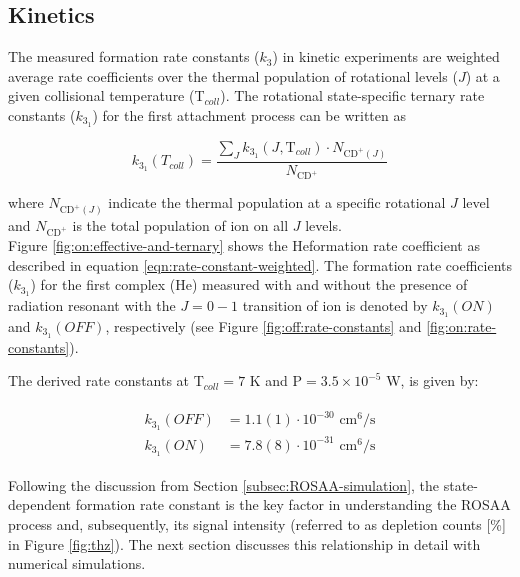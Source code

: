 \subsection{Kinetics}
\label{subsec:CD+-kinetics}

The measured formation rate constants ($k_3$) in kinetic experiments are 
weighted average rate coefficients over the thermal population of rotational
levels ($J$) at a given collisional temperature (T$_{coll}$). The rotational
state-specific ternary rate constants ($k_{3_1}$) for the first attachment
process can be written as

\begin{equation}
    k_{3_1} (T_{coll}) = \frac{\sum_{J} k_{3_1} (J, \text{T}_{coll}) \cdot N_{\text{CD}^+ (J)} }{N_{\text{CD}^+}}
    \label{eqn:rate-constant-weighted}
\end{equation}

where $N_{\text{CD}^+ (J)}$ indicate the thermal population 
at a specific rotational $J$ level and $N_{\text{CD}^+}$  is the total population of \CD ion on all $J$ levels.\\



Figure \ref{fig:on:effective-and-ternary} shows the He\CD formation rate
coefficient as described in equation \ref{eqn:rate-constant-weighted}. The
formation rate coefficients ($k_{3_1}$) for the first complex (He\CD) measured with and without the presence of radiation resonant with the $J=0-1$ transition of \CD ion is denoted by $k_{3_1}(ON)$ and
$k_{3_1}(OFF)$, respectively (see Figure \ref{fig:off:rate-constants} and \ref{fig:on:rate-constants}).

The derived rate constants at T$_{coll}=7$ K and P$=3.5\times 10^{-5}$ W, is given by:

\begin{align}
    \label{eqn:k-on-off}
    \begin{split}
        k_{3_1}(OFF) &= 1.1(1) \cdot 10^{-30} \text{ cm}^6/\text{s}\\
        k_{3_1}(ON) &= 7.8(8) \cdot 10^{-31} \text{ cm}^6/\text{s}
    \end{split}
\end{align}

Following the discussion from Section \ref{subsec:ROSAA-simulation}, the
state-dependent formation rate constant is the key factor in understanding the
ROSAA process and, subsequently, its signal intensity (referred to as depletion
counts [\%] in Figure \ref{fig:thz}). The next section discusses this
relationship in detail with numerical simulations.

